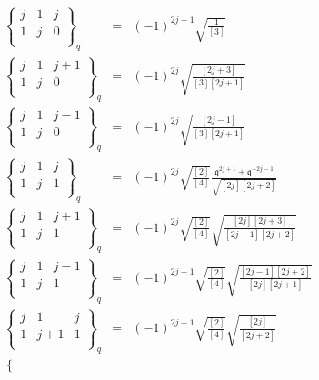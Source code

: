 \documentclass[11pt]{article}
\begin{document}
\begin{eqnarray}
  \left\{  \begin{array}{ccc}
  j & 1 & j \\ 1 & j & 0  \\ \end{array}   \right\}_q  &=& (-1)^{2j+1}\sqrt{\frac{1}{[3]}} \\
   \left\{  \begin{array}{ccc}
  j & 1 & j+1 \\ 1 & j & 0  \\ \end{array}   \right\}_q  &=& (-1)^{2j}\sqrt{\frac{[2j+3]}{[3][2j+1]}} \\
   \left\{  \begin{array}{ccc}
  j & 1 & j-1 \\ 1 & j & 0  \\ \end{array}   \right\}_q  &=& (-1)^{2j}\sqrt{\frac{[2j-1]}{[3][2j+1]}} \\
    \left\{  \begin{array}{ccc}
  j & 1 & j \\ 1 & j & 1  \\ \end{array}   \right\}_q  &=& (-1)^{2j}\sqrt{\frac{[2]}{[4]}} \frac{\mathfrak{q}^{2j+1}+\mathfrak{q}^{-2j-1}}{\sqrt{[2j][2j+2]}} \\
    \left\{  \begin{array}{ccc}
  j & 1 & j+1 \\ 1 & j & 1  \\ \end{array}   \right\}_q  &=& (-1)^{2j}\sqrt{\frac{[2]}{[4]}} \sqrt{\frac{[2j][2j+3]}{[2j+1][2j+2]}} \\
    \left\{  \begin{array}{ccc}
  j & 1 & j-1 \\ 1 & j & 1  \\ \end{array}   \right\}_q  &=& (-1)^{2j+1}\sqrt{\frac{[2]}{[4]}} \sqrt{\frac{[2j-1][2j+2]}{[2j][2j+1]}} \\
     \left\{  \begin{array}{ccc}
  j & 1 & j \\ 1 & j+1 & 1  \\ \end{array}   \right\}_q  &=& (-1)^{2j+1}\sqrt{\frac{[2]}{[4]}} \sqrt{\frac{[2j]}{[2j+2]}} \\
       \left\{  \begin{array}{ccc}

\end{array}
\end{eqnarray}
\end{document}
